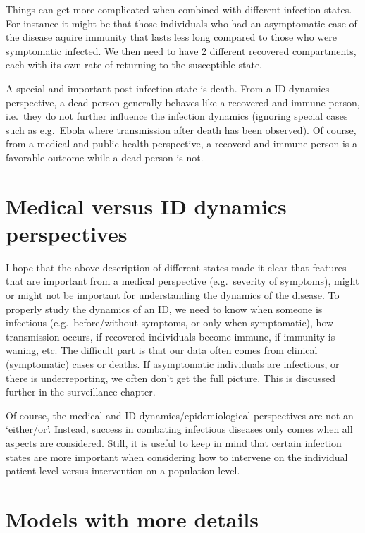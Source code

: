 \documentclass[
]{book}
\begin{document}
Things can get more complicated when combined with different infection states. For instance it might be that those individuals who had an asymptomatic case of the disease aquire immunity that lasts less long compared to those who were symptomatic infected. We then need to have 2 different recovered compartments, each with its own rate of returning to the susceptible state.

A special and important post-infection state is death. From a ID dynamics perspective, a dead person generally behaves like a recovered and immune person, i.e.~they do not further influence the infection dynamics (ignoring special cases such as e.g.~Ebola where transmission after death has been observed). Of course, from a medical and public health perspective, a recoverd and immune person is a favorable outcome while a dead person is not.

\hypertarget{medical-versus-id-dynamics-perspectives}{%
\section{Medical versus ID dynamics perspectives}\label{medical-versus-id-dynamics-perspectives}}

I hope that the above description of different states made it clear that features that are important from a medical perspective (e.g.~severity of symptoms), might or might not be important for understanding the dynamics of the disease. To properly study the dynamics of an ID, we need to know when someone is infectious (e.g.~before/without symptoms, or only when symptomatic), how transmission occurs, if recovered individuals become immune, if immunity is waning, etc. The difficult part is that our data often comes from clinical (symptomatic) cases or deaths. If asymptomatic individuals are infectious, or there is underreporting, we often don't get the full picture. This is discussed further in the surveillance chapter.

Of course, the medical and ID dynamics/epidemiological perspectives are not an `either/or'. Instead, success in combating infectious diseases only comes when all aspects are considered. Still, it is useful to keep in mind that certain infection states are more important when considering how to intervene on the individual patient level versus intervention on a population level.

\hypertarget{models-with-more-details}{%
\section{Models with more details}\label{models-with-more-details}}
\end{document}
